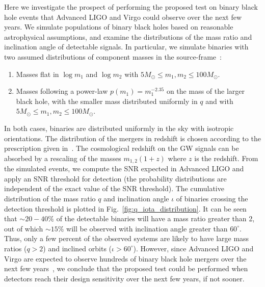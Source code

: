 \documentclass[prl,preprintnumbers,twocolumn,eqsecnum,floatfix,a4paper,nofootinbib,superscriptaddress]{revtex4}
\begin{document}
Here we investigate the  prospect of performing the proposed test on binary black hole events that Advanced LIGO and Virgo could observe over the next few years.  We simulate populations of binary black holes based on reasonable astrophysical assumptions, and examine the distributions of the mass ratio and inclination angle of detectable signals. In particular, we simulate binaries with two assumed distributions of component masses in the source-frame~\cite{Abbott:2016nhf}:
\begin{enumerate}
\item Masses flat in $\log m_1$ and $\log m_2$   with $5 M_\odot \leq m_1, m_2  \leq 100 M_\odot$. 
\item Masses following a power-law $p(m_1) = m_1^{-2.35}$ on the mass of the larger black hole, with the smaller mass distributed uniformly in $q$ and with $5 M_\odot \leq m_1, m_2  \leq 100 M_\odot$. 
\end{enumerate}
In both cases, binaries are distributed uniformly in the sky with isotropic orientations. The distribution of the mergers in redshift is chosen according to the prescription given in~\cite{Dominik:2013tma}. The cosmological redshift on the GW signals can be absorbed by a rescaling of the masses $m_{1,2} (1+z)$ where $z$ is the redshift. From the simulated events, we compute the SNR expected  in Advanced LIGO and apply an SNR threshold for detection (the probability distributions are independent of the exact value of the SNR threshold). The cumulative distribution of the mass ratio $q$ and inclination angle $\iota$ of binaries crossing the detection threshold is plotted in Fig.~\ref{fig:q_iota_distribution}. It can be seen that $\sim 20 - 40\%$ of the detectable binaries will have a mass ratio greater than 2, out of which  $\sim 15\%$ will  be observed with inclination angle greater than $60^\circ$. Thus, only a few percent of the observed systems are likely to have large mass ratios ($q > 2$) and inclined orbits ($\iota > 60^\circ$). However, since Advanced LIGO and Virgo are expected to observe hundreds of binary black hole mergers over the next few years~\cite{Abbott:2016nhf}, we conclude that the proposed test could be performed when detectors reach their design sensitivity over the next few years, if not sooner.
\end{document}
